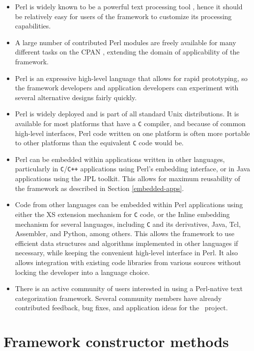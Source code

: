 \begin{itemize}
\item Perl is widely known to be a powerful text processing tool
   \cite{friedl:02, pedersen:01} \cite[p. 121]{manning:99}, hence it should be
   relatively easy for users of the framework to customize its
   processing capabilities.
\item A large number of contributed Perl modules are freely available
   for many different tasks on the CPAN \cite{cpan}, extending the
   domain of applicability of the framework.
\item Perl is an expressive high-level language that allows for rapid
   prototyping, so the framework developers and application developers
   can experiment with several alternative designs fairly quickly.
\item Perl is widely deployed and is part of all standard Unix
   distributions.  It is available for most platforms that have a
   \texttt{C} compiler, and because of common high-level interfaces,
   Perl code written on one platform is often more portable to other
   platforms than the equivalent \texttt{C} code would be.
\item Perl can be embedded within applications written in other
   languages, particularly in \texttt{C}/\texttt{C++} applications
   using Perl's embedding interface, or in Java applications using the
   JPL toolkit.  This allows for maximum reusability of the
   framework as described in Section \ref{embedded-apps}.
\item Code from other languages can be embedded within Perl
   applications using either the XS extension mechanism for
   \texttt{C} code, or the Inline embedding mechanism for several
   languages, including \texttt{C} and its derivatives, Java, Tcl,
   Assembler, and Python, among others.  This allows the framework to
   use efficient data structures and algorithms implemented in other
   languages if necessary, while keeping the convenient high-level
   interface in Perl.  It also allows integration with existing code
   libraries from various sources without locking the developer into a
   language choice.
\item There is an active community of users interested in using a
   Perl-native text categorization framework.  Several community
   members have already contributed feedback, bug fixes, and
   application ideas for the \aicat\ project.
\end{itemize}

\section{Framework constructor methods}
\label{constructor-methods}

